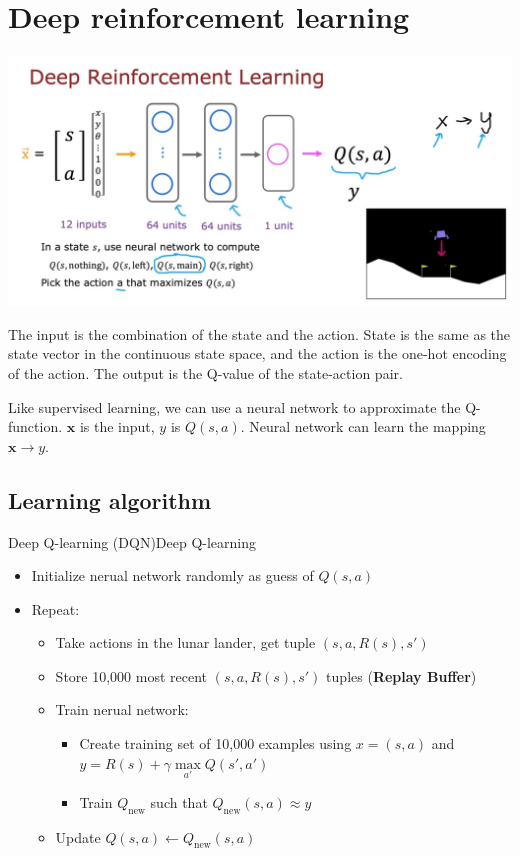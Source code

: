 \section{Deep reinforcement learning}
\noindent 
\includegraphics*[width=\textwidth]{images/19.3}

The input is the combination of the state and the action. State is the same as the state vector in the continuous state space,
and the action is the one-hot encoding of the action. The output is the Q-value of the state-action pair.

Like supervised learning, we can use a neural network to approximate the Q-function. $\mathbf{x}$ 
is the input, $y$ is $Q(s,a)$. Neural network can learn the mapping $\mathbf{x} \rightarrow y$.

\subsection*{Learning algorithm}
\begin{thmbox}{Deep Q-learning (DQN)}{Deep Q-learning}
    \begin{itemize}
        \item Initialize nerual network randomly as guess of $Q(s,a)$
        \item Repeat:
        \begin{itemize}
            \item Take actions in the lunar lander, get tuple $(s,a,R(s),s')$
            \item Store 10,000 most recent $(s,a,R(s),s')$ tuples (\textbf{Replay Buffer})
            \item Train nerual network:
            \begin{itemize}
                \item Create training set of 10,000 examples 
                using $x = (s,a)$ and $y = R(s) + \gamma\max \limits_{a'}Q(s',a')$
                \item Train $Q_{\mathrm{new}}$ such that $Q_{\mathrm{new}}(s,a) \approx y$
            \end{itemize}
            \item Update $Q(s,a) \leftarrow Q_{\mathrm{new}}(s,a)$
        \end{itemize}
    \end{itemize}
\end{thmbox}

